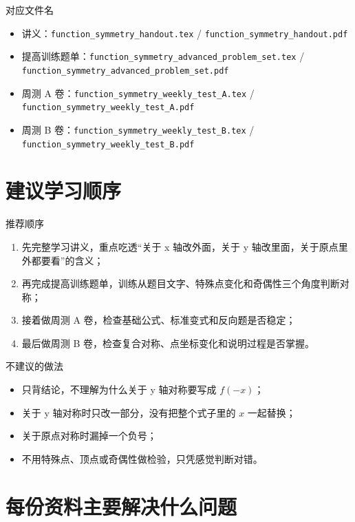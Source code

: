 \documentclass[11pt,a4paper,fontset=fandol]{ctexart}
\begin{document}
\begin{infobox}{对应文件名}
\begin{itemize}
  \item 讲义：\texttt{function\_symmetry\_handout.tex} / \texttt{function\_symmetry\_handout.pdf}
  \item 提高训练题单：\texttt{function\_symmetry\_advanced\_problem\_set.tex} / \texttt{function\_symmetry\_advanced\_problem\_set.pdf}
  \item 周测 A 卷：\texttt{function\_symmetry\_weekly\_test\_A.tex} / \texttt{function\_symmetry\_weekly\_test\_A.pdf}
  \item 周测 B 卷：\texttt{function\_symmetry\_weekly\_test\_B.tex} / \texttt{function\_symmetry\_weekly\_test\_B.pdf}
\end{itemize}
\end{infobox}

\section{建议学习顺序}

\begin{goalbox}{推荐顺序}
\begin{enumerate}
  \item 先完整学习讲义，重点吃透“关于 x 轴改外面，关于 y 轴改里面，关于原点里外都要看”的含义；
  \item 再完成提高训练题单，训练从题目文字、特殊点变化和奇偶性三个角度判断对称；
  \item 接着做周测 A 卷，检查基础公式、标准变式和反向题是否稳定；
  \item 最后做周测 B 卷，检查复合对称、点坐标变化和说明过程是否掌握。
\end{enumerate}
\end{goalbox}

\begin{warnbox}{不建议的做法}
\begin{itemize}
  \item 只背结论，不理解为什么关于 y 轴对称要写成 $f(-x)$；
  \item 关于 y 轴对称时只改一部分，没有把整个式子里的 $x$ 一起替换；
  \item 关于原点对称时漏掉一个负号；
  \item 不用特殊点、顶点或奇偶性做检验，只凭感觉判断对错。
\end{itemize}
\end{warnbox}

\section{每份资料主要解决什么问题}
\end{document}
